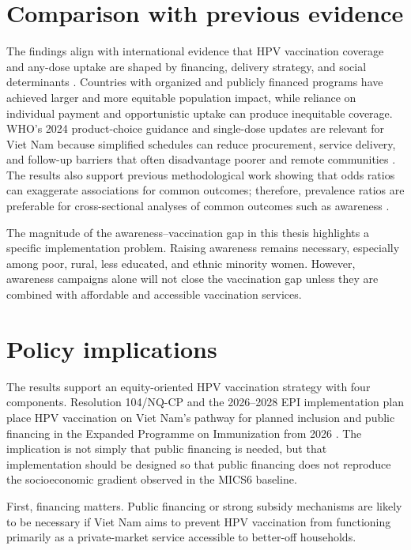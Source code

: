\section{Comparison with previous evidence}

The findings align with international evidence that HPV vaccination coverage and any-dose uptake are shaped by financing, delivery strategy, and social determinants \cite{bruni2021,gallagher2018}. Countries with organized and publicly financed programs have achieved larger and more equitable population impact, while reliance on individual payment and opportunistic uptake can produce inequitable coverage. WHO's 2024 product-choice guidance and single-dose updates are relevant for Viet Nam because simplified schedules can reduce procurement, service delivery, and follow-up barriers that often disadvantage poorer and remote communities \cite{who2024productchoice,who2024singledose}. The results also support previous methodological work showing that odds ratios can exaggerate associations for common outcomes; therefore, prevalence ratios are preferable for cross-sectional analyses of common outcomes such as awareness \cite{barros2003,zou2004}.

The magnitude of the awareness--vaccination gap in this thesis highlights a specific implementation problem. Raising awareness remains necessary, especially among poor, rural, less educated, and ethnic minority women. However, awareness campaigns alone will not close the vaccination gap unless they are combined with affordable and accessible vaccination services.

\section{Policy implications}

The results support an equity-oriented HPV vaccination strategy with four components. Resolution 104/NQ-CP and the 2026--2028 EPI implementation plan place HPV vaccination on Viet Nam's pathway for planned inclusion and public financing in the Expanded Programme on Immunization from 2026 \cite{govvn2022nq104,baochinhphu2025epi}. The implication is not simply that public financing is needed, but that implementation should be designed so that public financing does not reproduce the socioeconomic gradient observed in the MICS6 baseline.

First, financing matters. Public financing or strong subsidy mechanisms are likely to be necessary if Viet Nam aims to prevent HPV vaccination from functioning primarily as a private-market service accessible to better-off households.

